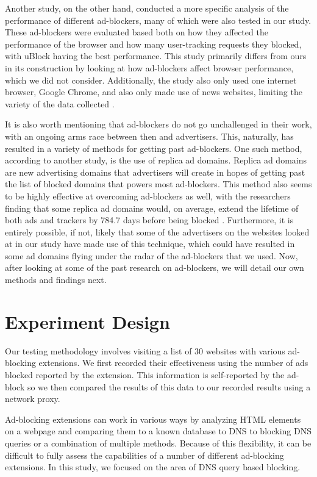 \documentclass[sigsmall]{acmart}
\begin{document}
Another study, on the other hand, conducted a more specific analysis of the performance of different ad-blockers, many of which were also tested in our study. These ad-blockers were evaluated based both on how they affected the performance of the browser and how many user-tracking requests they blocked, with uBlock having the best performance. This study primarily differs from ours in its construction by looking at how ad-blockers affect browser performance, which we did not consider. Additionally, the study also only used one internet browser, Google Chrome, and also only made use of news websites, limiting the variety of the data collected \cite{10.1145/3091478.3091514}.

It is also worth mentioning that ad-blockers do not go unchallenged in their work, with an ongoing arms race between then and advertisers. This, naturally, has resulted in a variety of methods for getting past ad-blockers. One such method, according to another study, is the use of replica ad domains. Replica ad domains are new advertising domains that advertisers will create in hopes of getting past the list of blocked domains that powers most ad-blockers. This method also seems to be highly effective at overcoming ad-blockers as well, with the researchers finding that some replica ad domains would, on average, extend the lifetime of both ads and trackers by 784.7 days before being blocked \cite{10.1145/3485447.3512218}. Furthermore, it is entirely possible, if not, likely that some of the advertisers on the websites looked at in our study have made use of this technique, which could have resulted in some ad domains flying under the radar of the ad-blockers that we used. Now, after looking at some of the past research on ad-blockers, we will detail our own methods and findings next.


\section*{Experiment Design}
Our testing methodology involves visiting a list of 30 websites with various ad-blocking extensions. We first recorded their effectiveness using the number of ads blocked reported by the extension. This information is self-reported by the ad-block so we then compared the results of this data to our recorded results using a network proxy.

Ad-blocking extensions can work in various ways by analyzing HTML elements on a webpage and comparing them to a known database to DNS to blocking DNS queries or a combination of multiple methods. Because of this flexibility, it can be difficult to fully assess the capabilities of a number of different ad-blocking extensions. In this study, we focused on the area of DNS query based blocking.
\end{document}
